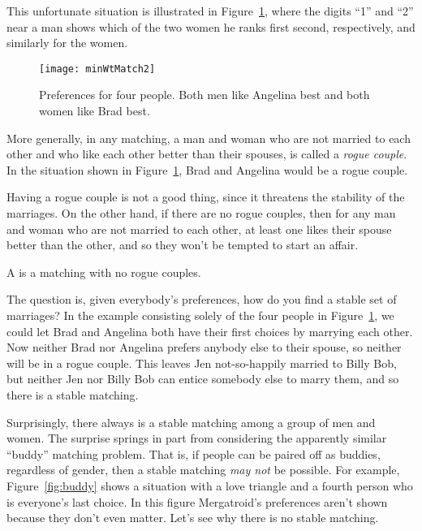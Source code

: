 This unfortunate situation is illustrated in
Figure~\ref{fig:minWtMatch2}, where the digits ``1'' and ``2'' near a
man shows which of the two women he ranks first second, respectively,
and similarly for the women.

\begin{figure}\redrawn


\texttt{[image: minWtMatch2]}

\caption{Preferences for four people.  Both men like Angelina best and
both women like Brad best.}
\label{fig:minWtMatch2}
\end{figure}

More generally, in any matching, a man and woman who are not married
to each other and who like each other better than their spouses, is
called a \emph{rogue couple}.  In the situation shown in
Figure~\ref{fig:minWtMatch2}, Brad and Angelina would be a rogue
couple.

Having a rogue couple is not a good thing, since it threatens the
stability of the marriages.  On the other hand, if there are no rogue
couples, then for any man and woman who are not married to each other,
at least one likes their spouse better than the other, and so they
won't be tempted to start an affair.

\begin{definition}
  A  is a matching with no rogue couples.
\end{definition}

The question is, given everybody's preferences, how do you find a
stable set of marriages?  In the example consisting solely of the four
people in Figure~\ref{fig:minWtMatch2}, we could let Brad and Angelina
both have their first choices by marrying each other.  Now neither
Brad nor Angelina prefers anybody else to their spouse, so neither
will be in a rogue couple.  This leaves Jen not-so-happily married to
Billy Bob, but neither Jen nor Billy Bob can entice somebody else to
marry them, and so there is a stable matching.

Surprisingly, there always is a stable matching among a group of men
and women.  The surprise springs in part from considering the
apparently similar ``buddy'' matching problem.  That is, if people can
be paired off as buddies, regardless of gender, then a stable matching
\emph{may not} be possible.  For example, Figure~\ref{fig:buddy} shows
a situation with a love triangle and a fourth person who is everyone's
last choice.  In this figure Mergatroid's preferences aren't shown
because they don't even matter.  Let's see why there is no stable
matching.


